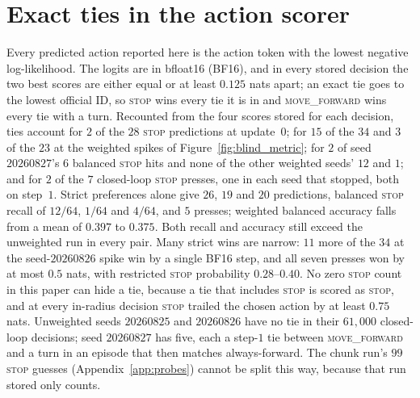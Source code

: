 \section{Exact ties in the action scorer}
\label{app:ties}

Every predicted action reported here is the action token with the lowest negative log-likelihood.
The logits are in bfloat16 (BF16), and in every stored decision the two best scores are either equal or at least
$0.125$ nats apart; an exact tie goes to the lowest official ID, so \textsc{stop} wins every tie it
is in and \textsc{move\_forward} wins every tie with a turn. Recounted from the four scores stored
for each decision, ties account for $2$ of the $28$ \textsc{stop} predictions at update~$0$; for
$15$ of the $34$ and $3$ of the $23$ at the weighted spikes of Figure~\ref{fig:blind_metric}; for
$2$ of seed $20260827$'s $6$ balanced \textsc{stop} hits and none of the other weighted seeds' $12$
and $1$; and for $2$ of the $7$ closed-loop \textsc{stop} presses, one in each seed that stopped,
both on step~$1$. Strict preferences alone give $26$, $19$ and $20$ predictions, balanced
\textsc{stop} recall of $12/64$, $1/64$ and $4/64$, and $5$ presses; weighted balanced accuracy
falls from a mean of $0.397$ to $0.375$. Both recall and accuracy still exceed the unweighted run in
every pair. Many strict wins are narrow: $11$ more of the $34$ at the seed-$20260826$ spike win by a
single BF16 step, and all seven presses won by at most $0.5$ nats, with restricted \textsc{stop}
probability $0.28$--$0.40$. No zero \textsc{stop} count in this paper can hide a tie, because a tie that includes
\textsc{stop} is scored as \textsc{stop}, and at every in-radius decision \textsc{stop} trailed the
chosen action by at least $0.75$ nats. Unweighted seeds $20260825$ and $20260826$ have no tie in
their $61{,}000$ closed-loop decisions; seed $20260827$ has five, each a step-$1$ tie between
\textsc{move\_forward} and a turn in an episode that then matches always-forward. The chunk run's $99$ \textsc{stop} guesses (Appendix~\ref{app:probes}) cannot be split this way, because that run
stored only counts.
